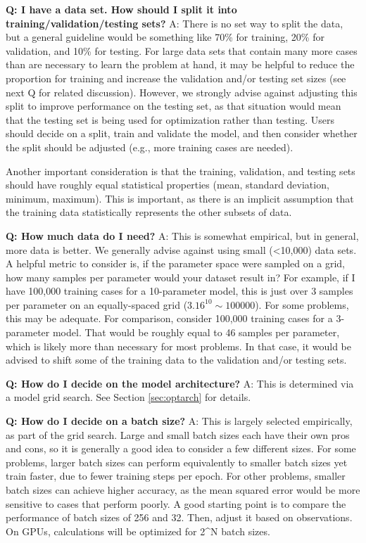 \documentclass[letterpaper, 12pt]{article}
\begin{document}
\noindent \textbf{Q: I have a data set.  How should I split it into 
training/validation/testing sets?}  A: There is no set way to split the data, 
but a general guideline would be something like 70\% for training, 20\% for 
validation, and 10\% for testing.  For large data sets that contain many more 
cases than are necessary to learn the problem at hand, it may be helpful to 
reduce the proportion for training and increase the validation and/or testing 
set sizes (see next Q for related discussion).  However, we strongly advise 
against adjusting this split to improve
performance on the testing set, as that situation would mean that the testing 
set is being used for optimization rather than testing.  Users should decide 
on a split, train and validate the model, and then consider whether the split 
should be adjusted (e.g., more training cases are needed).  \newline 

\noindent Another important 
consideration is that the training, validation, and testing sets should have 
roughly equal statistical properties (mean, standard deviation, minimum, 
maximum).  This is important, as there is an implicit assumption that the 
training data statistically represents the other subsets of data.\newline

\noindent \textbf{Q: How much data do I need?} A: This is somewhat empirical, 
but in general, more data is better.  We generally advise against using small 
(\textless 10,000) data sets.  A helpful metric to consider is, if the 
parameter space were sampled on a grid, how many samples per parameter would 
your dataset result in?  For example, if I have 100,000 training cases for a 
10-parameter model, this is just over 3 samples per parameter on an 
equally-spaced grid ($3.16^{10} \sim 100000$).  For some problems, this may be 
adequate.  For comparison, consider 100,000 training cases for a 3-parameter 
model.  That would be roughly equal to 46 samples per parameter, which is 
likely more than necessary for most problems.  In that case, it would be 
advised to shift some of the training data to the validation and/or testing 
sets. \newline

\noindent \textbf{Q: How do I decide on the model architecture?} A: This is 
determined via a model grid search.  See Section \ref{sec:optarch} for details.

\noindent \textbf{Q: How do I decide on a batch size?} A: This is largely 
selected empirically, as part of the grid search.  
Large and small batch sizes each have their own pros 
and cons, so it is generally a good idea to consider a few different sizes.  
For some problems, larger batch 
sizes can perform equivalently to smaller batch sizes yet train faster, due 
to fewer training steps per epoch.  For other problems, smaller batch sizes 
can achieve higher accuracy, as the mean squared error would be more sensitive 
to cases that perform poorly.  A good starting point is to compare the 
performance of batch sizes of 256 and 32.  Then, adjust it based on 
observations.  On GPUs, calculations will be optimized for 2\^{}N batch 
sizes.\newline
\end{document}
